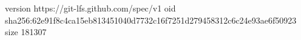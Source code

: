 version https://git-lfs.github.com/spec/v1
oid sha256:62e91f8c4ca15eb813451040d7732c16f7251d279458312c6c24e93ae6f50923
size 181307
